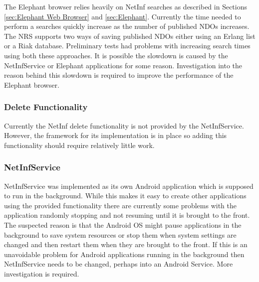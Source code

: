 The Elephant browser relies heavily on NetInf searches as described in Sections \ref{sec:Elephant Web Browser} and \ref{sec:Elephant}. Currently the time needed to perform a searches quickly increase as the number of published NDOs increases. The NRS supports two ways of saving published NDOs either using an Erlang list or a Riak database. Preliminary tests had problems with increasing search times using both these approaches. It is possible the slowdown is caused by the NetInfService or Elephant applications for some reason. Investigation into the reason behind this slowdown is required to improve the performance of the Elephant browser.

\subsubsection{Delete Functionality}

Currently the NetInf delete functionality is not provided by the NetInfService. However, the framework for its implementation is in place so adding this functionality should require relatively little work.

\subsubsection{NetInfService}

NetInfService was implemented as its own Android application which is supposed to run in the background. While this makes it easy to create other applications using the provided functionality there are currently some problems with the application randomly stopping and not resuming until it is brought to the front. The suspected reason is that the Android OS might pause applications in the background to save system resources or stop them when system settings are changed and then restart them when they are brought to the front. If this is an unavoidable problem for Android applications running in the background then NetInfService needs to be changed, perhaps into an Android Service. More investigation is required.
